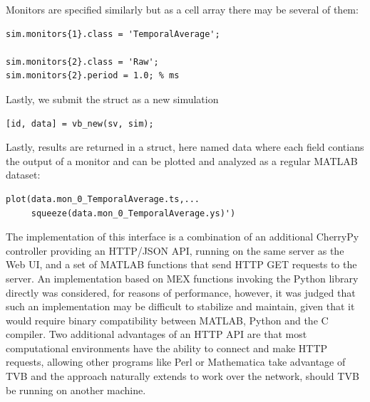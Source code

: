 Monitors are specified similarly but as a cell array there may be
several of them:

\begin{lstlisting}
sim.monitors{1}.class = 'TemporalAverage';

sim.monitors{2}.class = 'Raw';
sim.monitors{2}.period = 1.0; % ms
\end{lstlisting}


Lastly, we submit the struct as a new simulation

\begin{lstlisting}
[id, data] = vb_new(sv, sim);
\end{lstlisting}

\noindent Lastly, results are returned in a struct, here named data
where each field contians the output of a monitor and can be plotted
and analyzed as a regular MATLAB dataset:

\begin{lstlisting}
plot(data.mon_0_TemporalAverage.ts,...
     squeeze(data.mon_0_TemporalAverage.ys)')
\end{lstlisting}

The implementation of this interface is a combination of an additional
CherryPy controller providing an HTTP/JSON API, running on the same 
server as the Web UI, and a set of MATLAB functions that send HTTP 
GET requests to the server. An implementation based on MEX functions 
invoking the Python library directly was considered, for reasons of 
performance, however, it was judged that such an implementation may be
difficult to stabilize and maintain, given that it would require binary
compatibility between MATLAB, Python and the C compiler. Two additional 
advantages of an HTTP API are that most computational environments have
the ability to connect and make HTTP requests, allowing other programs 
like Perl or Mathematica take advantage of TVB and the approach naturally
extends to work over the network, should TVB be running on another machine.



